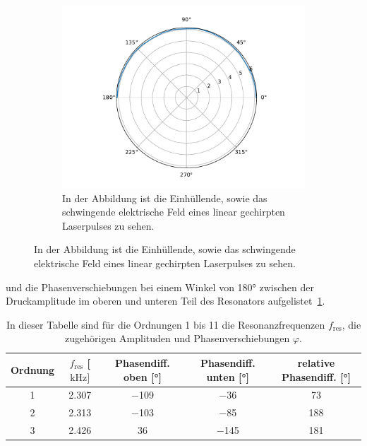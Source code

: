 \begin{figure}[ht]
                \centering
                \begin{subfigure}[b]{0.45\textwidth}
                    \centering
                    \includegraphics[scale=0.3]{./pictures/H_mol_resonanz_1_2426Hz.pdf}
                    \caption{In der Abbildung ist die Einhüllende, sowie das schwingende elektrische Feld eines linear gechirpten Laserpulses zu sehen.}
                    \label{fig:H_mol_resonanz_1_2426Hz}
                \end{subfigure}
            \end{figure}
            \FloatBarrier
            und die Phasenverschiebungen bei einem Winkel von 180° zwischen der Druckamplitude im oberen und unteren Teil des Resonators aufgelistet~\ref{tab:rel_phasenverschiebung}.
            \FloatBarrier
            \begin{table}[h]
                \centering
                \caption{In dieser Tabelle sind für die Ordnungen 1 bis 11 die Resonanzfrequenzen $f_{\text{res}}$, die zugehörigen Amplituden und Phasenverschiebungen $\varphi$.}
                \label{tab:rel_phasenverschiebung}
                \begin{tabular}{c c c c c}
                \toprule
                {Ordnung} & {$f_{\text{res}}$ [$\si{\kilo\hertz}]$} & {Phasendiff. oben [°]} & {Phasendiff. unten [°]} & {relative Phasendiff. [°]} \\
                \midrule
                \num{1}  & \num{2.307}  &  \num{-109}  &  \num{-36}   & \num{73}      \\
                \num{2}  & \num{2.313}  &  \num{-103}  &  \num{-85}   & \num{188}     \\
                \num{3}  & \num{2.426}  &  \num{36}    &  \num{-145}  & \num{181}     \\
                \bottomrule
                \end{tabular}
            \end{table}
